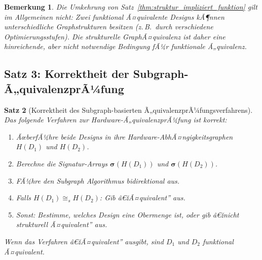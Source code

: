 ﻿\documentclass[12pt,a4paper]{report}
\newtheorem{theorem}{Satz}[section]
\newtheorem{bemerkung}[theorem]{Bemerkung}
\begin{document}
\begin{bemerkung}
Die Umkehrung von Satz~\ref{thm:struktur_impliziert_funktion} gilt im Allgemeinen \emph{nicht}: Zwei funktional Ã¤quivalente Designs kÃ¶nnen unterschiedliche Graphstrukturen besitzen (z.\,B.\ durch verschiedene Optimierungsstufen). Die strukturelle GraphÃ¤quivalenz ist daher eine \emph{hinreichende}, aber nicht notwendige Bedingung fÃ¼r funktionale Ã„quivalenz.
\end{bemerkung}

\subsection{Satz 3: Korrektheit der Subgraph-Ã„quivalenzprÃ¼fung}

\begin{theorem}[Korrektheit des Subgraph-basierten Ã„quivalenzprÃ¼fungsverfahrens]
\label{thm:korrektheit_aequivalenz}
Das folgende Verfahren zur Hardware-Ã„quivalenzprÃ¼fung ist korrekt:

\begin{enumerate}
    \item ÃœberfÃ¼hre beide Designs in ihre Hardware-AbhÃ¤ngigkeitsgraphen $H(D_1)$ und $H(D_2)$.
    \item Berechne die Signatur-Arrays $\boldsymbol{\sigma}(H(D_1))$ und $\boldsymbol{\sigma}(H(D_2))$.
    \item FÃ¼hre den Subgraph Algorithmus bidirektional aus.
    \item Falls $H(D_1) \cong_s H(D_2)$: Gib â€žÃ¤quivalent'' aus.
    \item Sonst: Bestimme, welches Design eine Obermenge ist, oder gib â€žnicht strukturell Ã¤quivalent'' aus.
\end{enumerate}

Wenn das Verfahren â€žÃ¤quivalent'' ausgibt, sind $D_1$ und $D_2$ funktional Ã¤quivalent.
\end{theorem}
\end{document}
